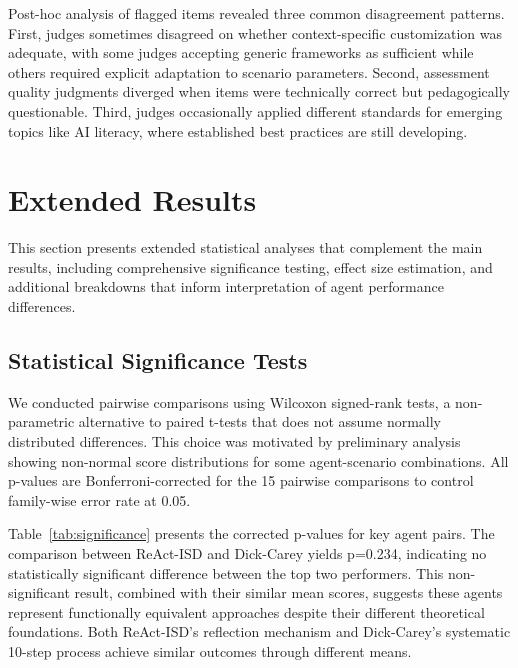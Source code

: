 Post-hoc analysis of flagged items revealed three common disagreement patterns. First, judges sometimes disagreed on whether context-specific customization was adequate, with some judges accepting generic frameworks as sufficient while others required explicit adaptation to scenario parameters. Second, assessment quality judgments diverged when items were technically correct but pedagogically questionable. Third, judges occasionally applied different standards for emerging topics like AI literacy, where established best practices are still developing.

\FloatBarrier
\section{Extended Results}
\label{app:extended-results}

This section presents extended statistical analyses that complement the main results, including comprehensive significance testing, effect size estimation, and additional breakdowns that inform interpretation of agent performance differences.

\subsection{Statistical Significance Tests}

We conducted pairwise comparisons using Wilcoxon signed-rank tests, a non-parametric alternative to paired t-tests that does not assume normally distributed differences. This choice was motivated by preliminary analysis showing non-normal score distributions for some agent-scenario combinations. All p-values are Bonferroni-corrected for the 15 pairwise comparisons to control family-wise error rate at 0.05.

Table~\ref{tab:significance} presents the corrected p-values for key agent pairs. The comparison between ReAct-ISD and Dick-Carey yields p=0.234, indicating no statistically significant difference between the top two performers. This non-significant result, combined with their similar mean scores, suggests these agents represent functionally equivalent approaches despite their different theoretical foundations. Both ReAct-ISD's reflection mechanism and Dick-Carey's systematic 10-step process achieve similar outcomes through different means.

